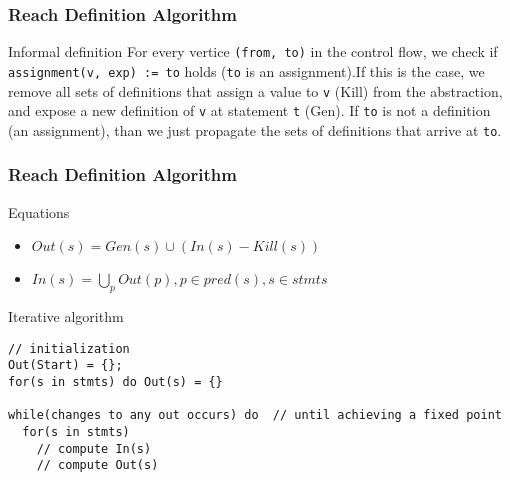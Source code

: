 
\begin{frame}
  \frametitle{Reach Definition Algorithm}

  \begin{block}{Informal definition}
   For every vertice \texttt{(from, to)} in the control flow,
   we check if \texttt{assignment(v, exp) := to} holds (\texttt{to} is
   an assignment).\pause If this is the case, we remove all sets of  definitions that
   assign a value to \texttt{v} ({\color{blue}Kill}) from the abstraction, and expose a new
   definition of \texttt{v} at statement \texttt{t} ({\color{blue}Gen}).
   If \texttt{to} is not a definition (an assignment), than we just propagate the
   sets of definitions that arrive at \texttt{to}.
  \end{block} 
\end{frame}

\begin{frame}[fragile]
  \frametitle{Reach Definition Algorithm}

  \begin{block}{Equations}
    \begin{itemize}
    \item $Out(s) = Gen(s) \cup (In(s) - Kill(s))$  
    \item $In(s) = \bigcup_p Out(p), p \in pred(s), s \in stmts$
    \end{itemize}
  \end{block}

  \pause

\begin{block}{Iterative algorithm}
\begin{small}
\begin{verbatim}
// initialization
Out(Start) = {};
for(s in stmts) do Out(s) = {} 

while(changes to any out occurs) do  // until achieving a fixed point
  for(s in stmts)
    // compute In(s) 
    // compute Out(s)   
\end{verbatim}
\end{small}
\end{block}
\end{frame}



